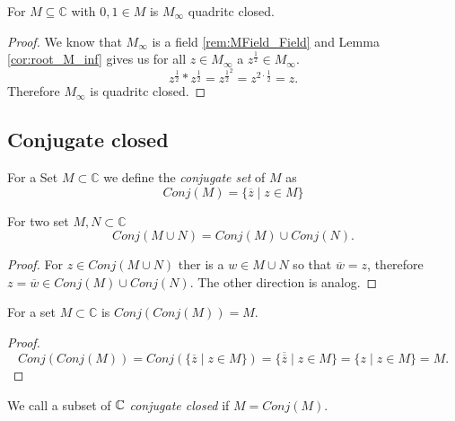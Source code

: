 \begin{lemma}
    \label{lem:M_inf_quad_closed}
    \leanok
    For $M\subseteq \mathbb{C}$ with $0,1 \in M$ is $M_{\infty}$ quadritc closed.
\end{lemma}
\begin{proof}
    We know that $M_{\infty}$ is a field \ref{rem:MField_Field} and Lemma \ref{cor:root_M_inf} gives us for all $z \in M_{\infty}$ a $z^{\frac{1}{2}} \in M_{\infty}$.
    $$ z^{\frac{1}{2}} * z^{\frac{1}{2}} = z^{\frac{1}{2}^2} = z^{2\cdot \frac{1}{2}} = z.$$
    Therefore $M_{\infty}$ is quadritc closed.
\end{proof}

\subsection*{Conjugate closed}
\begin{definition}
    \label{def:conj_set}
    \leanok
    For a Set $M \subset \mathbb{C}$ we define the \emph{conjugate set} of $M$ as 
    \begin{equation*}
        Conj(M) = \{\overline{z}\mid z\in M\}
    \end{equation*}
\end{definition}

\begin{lemma}
    \label{lem:conj_union}
    \leanok
    For two set $M,N \subset \mathbb{C}$ $$Conj(M\cup N) = Conj(M) \cup Conj(N).$$
\end{lemma}
\begin{proof}
    For $z \in Conj(M\cup N)$ ther is a $w \in M\cup N$ so that $\overline{w} = z$, therefore $ z = \overline{w} \in Conj(M) \cup Conj(N)$. The other direction is analog.
\end{proof}

\begin{lemma}
    \label{lem:conj_conj_id}
    \leanok
    For a set $M \subset \mathbb{C}$ is $Conj(Conj(M)) = M$.
\end{lemma}
\begin{proof}
    $$Conj(Conj(M)) = Conj(\{\overline{z}\mid z\in M\}) = \{\overline{\overline{z}}\mid z\in M\} = \{ z \mid z\in M\} = M.$$
\end{proof}

\begin{definition}
    \label{def:conj_closed}
    \leanok
    We call a subset of $\mathbb{C}$ \emph{conjugate closed} if $M= Conj(M)$.
\end{definition}


